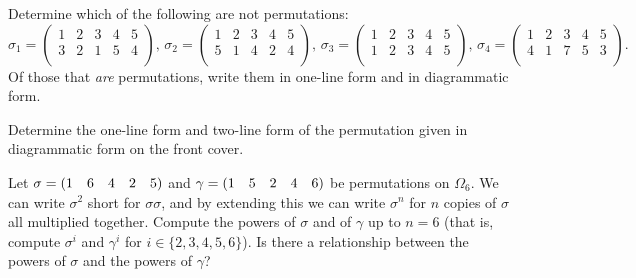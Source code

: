\begin{exercise}\label{ex:ch1-notpermutations}
    Determine which of the following are not permutations:
    \[
    \sigma_{1} = \begin{pmatrix}
        1 & 2 & 3 & 4 & 5 \\
        3 & 2 & 1 & 5 & 4 \\
    \end{pmatrix},\, \sigma_{2} = \begin{pmatrix}
        1 & 2 & 3 & 4 & 5 \\
        5 & 1 & 4 & 2 & 4 \\
    \end{pmatrix},\, \sigma_{3} = \begin{pmatrix}
        1 & 2 & 3 & 4 & 5 \\
        1 & 2 & 3 & 4 & 5 \\
    \end{pmatrix},\, \sigma_{4} = \begin{pmatrix}
        1 & 2 & 3 & 4 & 5 \\
        4 & 1 & 7 & 5 & 3 \\
    \end{pmatrix}.
    \]
    Of those that \textit{are} permutations, write them in one-line form and in diagrammatic form.
\end{exercise}

\begin{exercise}\label{ex:ch1-frontcover}
    Determine the one-line form and two-line form of the permutation given in diagrammatic form on the front cover.
\end{exercise}

\begin{exercise}\label{ex:ch1-powers}
    Let $\sigma = (1 \quad 6 \quad 4 \quad 2 \quad 5)$ and $\gamma = (1 \quad 5 \quad 2 \quad 4 \quad 6)$ be permutations on $\Omega_{6}$. We can write $\sigma^{2}$ short for $\sigma\sigma$, and by extending this we can write $\sigma^{n}$ for $n$ copies of $\sigma$ all multiplied together. Compute the powers of $\sigma$ and of $\gamma$ up to $n = 6$ (that is, compute $\sigma^{i}$ and $\gamma^{i}$ for $i \in \{2, 3, 4, 5, 6\}$). Is there a relationship between the powers of $\sigma$ and the powers of $\gamma$?
\end{exercise}

